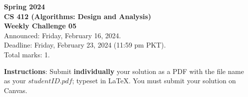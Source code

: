 \documentclass[a4paper]{exam}
\begin{document}
\begin{center}
{\Large \textbf{Spring 2024}}\vspace{1.0em}\\
{\Large \textbf{CS 412 (Algorithms: Design and Analysis)}}\vspace{1.0em}\\
{\Large \textbf{Weekly Challenge 05 }}\vspace{1.0em}\\
{\Large Announced: Friday, February 16, 2024.}\\
\vspace{.25em}
{\Large Deadline: Friday, February 23, 2024 (11:59 pm PKT).}\\ 
\vspace{.3em}
{\Large Total marks: 1.}
\vspace{.5em}\\
\end{center}
\textbf{Instructions}: Submit \textbf{individually} your solution as a PDF with the file name as your $studentID.pdf$; typeset in LaTeX. You must submit your solution on Canvas.
\end{document}
